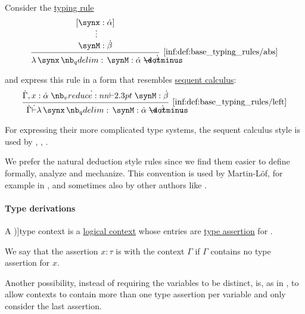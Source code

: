 \begin{remark}\label{rem:typing_rule_style}
  Consider the \hyperref[def:simple_typing_rule]{typing rule}
  \begin{equation*}
    \begin{prooftree}
      \hypo{ [\synx: \syn\alpha] }
      \ellipsis {} { \synM: \syn\beta }
      \infer1[\ref{inf:def:base_typing_rules/abs}]{ \qabs \synx \synM: \syn\alpha \synimplies \syn\beta }
    \end{prooftree}
  \end{equation*}

   and  express this rule in a form that resembles \hyperref[rem:sequent_calculus]{sequent calculus}:
  \begin{equation*}
    \begin{prooftree}
      \hypo{ \syn\Gamma, x: \syn\alpha \synvdash \synM: \syn\beta }
      \infer1[\ref{inf:def:base_typing_rules/left}]{ \syn\Gamma \syn\vdash \qabs \synx \synM: \syn\alpha \synimplies \syn\beta }
    \end{prooftree}
  \end{equation*}

  For expressing their more complicated type systems, the sequent calculus style is used by , , .

  We prefer the natural deduction style rules since we find them easier to define formally, analyze and mechanize. This convention is used by Martin-L\"of, for example in \cite{MartinLöf1984IntTypeTheory}, and sometimes also by other authors like .
\end{remark}

\paragraph{Type derivations}

\begin{definition}\label{def:type_context}
  A \term[en=type-context (\cite[def. 2A5]{Hindley1997STT})]{type context} is a \hyperref[def:logical_context]{logical context} whose entries are \hyperref[def:type_assertion]{type assertion} for .

  We say that the assertion \( x: \tau \) is  with the context \( \Gamma \) if \( \Gamma \) contains no type assertion for \( x \).
\end{definition}
\begin{comments}
  \item Another possibility, instead of requiring the variables to be distinct, is, as in \cite[159]{Mimram2020Types}, to allow contexts to contain more than one type assertion per variable and only consider the last assertion.
\end{comments}

